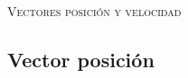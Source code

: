 \documentclass[11pt, spanish, a4paper, twoside]{article}
\begin{document}
\begin{center}
	\textsc{\large Vectores posición y velocidad}
\end{center}


			

\begin{enumerate}
	\section*{Vector posición}
	

\end{enumerate}
\end{document}

